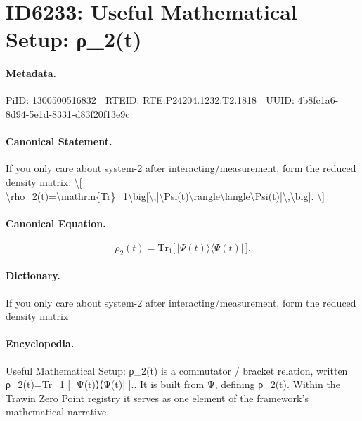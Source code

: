 \section*{ID6233: Useful Mathematical Setup: ρ\_2(t)}
\paragraph{Metadata.}
PiID: 1300500516832 | RTEID: RTE:P24204.1232:T2.1818 | UUID: 4b8fc1a6-8d94-5e1d-8331-d83f20f13e9c

\paragraph{Canonical Statement.}
If you only care about system-2 after interacting/measurement, form the reduced density matrix: \textbackslash{}[ \textbackslash{}rho\_2(t)=\textbackslash{}mathrm\{Tr\}\_1\textbackslash{}big[\textbackslash{},|\textbackslash{}Psi(t)\textbackslash{}rangle\textbackslash{}langle\textbackslash{}Psi(t)|\textbackslash{},\textbackslash{}big]. \textbackslash{}]

\paragraph{Canonical Equation.}
\[
\rho_2(t)=\mathrm{Tr}_1\big[\,|\Psi(t)\rangle\langle\Psi(t)|\,\big].
\]

\paragraph{Dictionary.}
If you only care about system-2 after interacting/measurement, form the reduced density matrix

\paragraph{Encyclopedia.}
Useful Mathematical Setup: ρ\_2(t) is a commutator / bracket relation, written ρ\_2(t)=Tr\_1 [ |Ψ(t)⟩⟨Ψ(t)| ].. It is built from Ψ, defining ρ\_2(t). Within the Trawin Zero Point registry it serves as one element of the framework's mathematical narrative.
